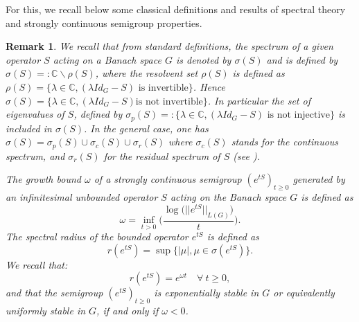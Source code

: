 \documentclass[10pt, english]{article}
\newtheorem{oss}[thm]{Remark}
\begin{document}
{For this, we recall below some classical definitions and results of spectral theory and strongly continuous semigroup properties.

\begin{oss}\label{StandardDef}
We recall that from standard definitions, the spectrum of a given operator $S$ acting on a Banach space $G$ is denoted by $\sigma(S)$ and is defined by $\sigma(S)=:\mathbb{C} \backslash \rho(S)$, where the resolvent set $\rho(S)$ is defined as
$\rho(S)=\{ \lambda \in \mathbb{C}, (\lambda Id_G - S) \mbox{ is invertible}\}$. Hence $\sigma(S)=\{ \lambda \in \mathbb{C}, (\lambda Id_G - S) \mbox{is not invertible}\}$. 
In particular the set of eigenvalues of $S$, defined by $\sigma_p(S)=:\{\lambda \in \mathbb{C},(\lambda Id_G -S) \mbox{ is not injective} \}$ is included in $\sigma(S)$. In the general case, one has $\sigma(S)=\sigma_p(S) \cup \sigma_c(S) \cup \sigma_r(S)$ where $\sigma_c(S)$ stands for the continuous spectrum, and $\sigma_r(S)$ for the residual spectrum of $S$ (see \cite{Pazy}).

The growth bound $\omega$ of a strongly continuous semigroup $(e^{tS})_{t \geqslant 0}$ generated by an infinitesimal unbounded operator $S$ acting on the Banach space $G$ is defined as
\begin{equation}\label{OMG}
\omega=\inf_{t>0}\Big(\dfrac{\log{\big(||e^{tS}||_{L(G)}\big)}}{t}\Big).
\end{equation}
The spectral radius of the bounded operator $e^{tS}$ is defined as 
\begin{equation}\label{SPR}
r(e^{tS})=\sup\{|\mu|, \mu \in \sigma(e^{tS})\}.
\end{equation}
We recall that:
 \begin{equation}\label{SRW}
r(e^{tS})=e^{\omega t} \quad \forall \ t \geqslant 0,
\end{equation}
and that the semigroup $(e^{tS})_{t \geqslant 0}$ is exponentially stable in $G$ or equivalently uniformly stable in $G$, if and only if $\omega<0$.
\end{oss}

}
\end{document}
